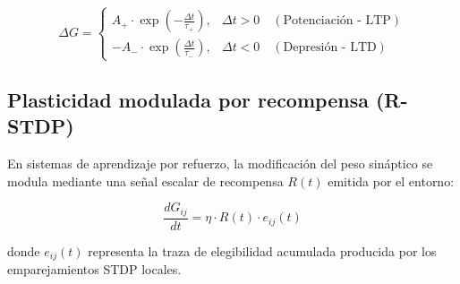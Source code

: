 \begin{equation}
\Delta G = 
\begin{cases}
A_+ \cdot \exp\left( -\frac{\Delta t}{\tau_+} \right), & \Delta t > 0 \quad (\text{Potenciación - LTP}) \\
-A_- \cdot \exp\left( \frac{\Delta t}{\tau_-} \right), & \Delta t < 0 \quad (\text{Depresión - LTD})
\end{cases}
\label{eq:stdp-window}
\end{equation}

\subsection{Plasticidad modulada por recompensa (R-STDP)}
\label{subsec:marco-rstdp}

En sistemas de aprendizaje por refuerzo, la modificación del peso sináptico se modula mediante una señal escalar de recompensa $R(t)$ emitida por el entorno:

\begin{equation}
\frac{dG_{ij}}{dt} = \eta \cdot R(t) \cdot e_{ij}(t)
\label{eq:rstdp-rule}
\end{equation}



donde $e_{ij}(t)$ representa la traza de elegibilidad acumulada producida por los emparejamientos STDP locales.
